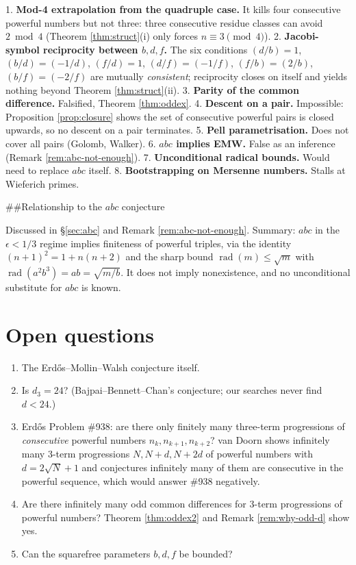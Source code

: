 \documentclass[11pt]{article}
\theoremstyle{definition}
\begin{document}
1. \textbf{Mod-4 extrapolation from the quadruple case.} It kills four consecutive
   powerful numbers but not three: three consecutive residue classes can avoid
   $2\bmod4$ (Theorem \ref{thm:struct}(i) only forces $n\equiv3\pmod4$).
2. \textbf{Jacobi-symbol reciprocity between $b,d,f$.} The six conditions
   $(d/b)=1$, $(b/d)=(-1/d)$, $(f/d)=1$, $(d/f)=(-1/f)$, $(f/b)=(2/b)$, $(b/f)=(-2/f)$
   are mutually \emph{consistent}; reciprocity closes on itself and yields nothing
   beyond Theorem \ref{thm:struct}(ii).
3. \textbf{Parity of the common difference.} Falsified, Theorem \ref{thm:oddex}.
4. \textbf{Descent on a pair.} Impossible: Proposition \ref{prop:closure} shows the
   set of consecutive powerful pairs is closed upwards, so no descent on a pair
   terminates.
5. \textbf{Pell parametrisation.} Does not cover all pairs (Golomb, Walker).
6. \textbf{$abc$ implies EMW.} False as an inference (Remark \ref{rem:abc-not-enough}).
7. \textbf{Unconditional radical bounds.} Would need to replace $abc$ itself.
8. \textbf{Bootstrapping on Mersenne numbers.} Stalls at Wieferich primes.

##{Relationship to the $abc$ conjecture}

Discussed in \S\ref{sec:abc} and Remark \ref{rem:abc-not-enough}. Summary: $abc$ in
the $\epsilon<1/3$ regime implies finiteness of powerful triples, via the identity
$(n+1)^2=1+n(n+2)$ and the sharp bound $\operatorname{rad}(m)\le\sqrt m$ with
$\operatorname{rad}(a^2b^3)=ab=\sqrt{m/b}$. It does not imply nonexistence, and no
unconditional substitute for $abc$ is known.

\section{Open questions}

\begin{enumerate}[leftmargin=2em]
\item The Erdős--Mollin--Walsh conjecture itself.
\item Is $d_3 = 24$? (Bajpai--Bennett--Chan's conjecture; our searches never find
$d<24$.)
\item Erdős Problem \#938: are there only finitely many three-term progressions of
\emph{consecutive} powerful numbers $n_k,n_{k+1},n_{k+2}$? van Doorn \cite{vandoorn2026}
shows infinitely many 3-term progressions $N,N+d,N+2d$ of powerful numbers with
$d=2\sqrt N+1$ and conjectures infinitely many of them are consecutive in the
powerful sequence, which would answer \#938 negatively.
\item Are there infinitely many odd common differences for 3-term progressions of
powerful numbers? Theorem \ref{thm:oddex2} and Remark \ref{rem:why-odd-d} show yes.
\item Can the squarefree parameters $b,d,f$ be bounded?
\end{enumerate}
\end{document}
